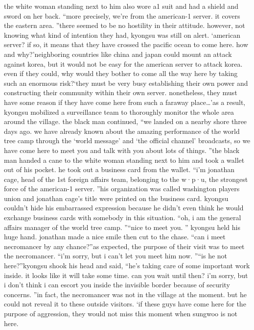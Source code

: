 the white woman standing next to him also wore a1 suit and had a shield and sword on her back.
“more precisely, we’re from the american-1 server.
 it covers the eastern area.
”there seemed to be no hostility in their attitude.
 however, not knowing what kind of intention they had, kyongsu was still on alert.
‘american server? if so, it means that they have crossed the pacific ocean to come here.
 how and why?’neighboring countries like china and japan could mount an attack against korea, but it would not be easy for the american server to attack korea.
even if they could, why would they bother to come all the way here by taking such an enormous risk?‘they must be very busy establishing their own power and constructing their community within their own server.
 nonetheless, they must have some reason if they have come here from such a faraway place…’as a result, kyongsu mobilized a surveillance team to thoroughly monitor the whole area around the village.
the black man continued, “we landed on a nearby shore three days ago.
 we have already known about the amazing performance of the world tree camp through the ‘world message’ and ‘the official channel’ broadcasts, so we have come here to meet you and talk with you about lots of things.
”the black man handed a cane to the white woman standing next to him and took a wallet out of his pocket.
 he took out a business card from the wallet.
“i’m jonathan cage, head of the 1st foreign affairs team, belonging to the w·p·u, the strongest force of the american-1 server.
”his organization was called washington players union and jonathan cage’s title were printed on the business card.
kyongsu couldn’t hide his embarrassed expression because he didn’t even think he would exchange business cards with somebody in this situation.
“oh, i am the general affairs manager of the world tree camp.
”“nice to meet you.
”
kyongsu held his huge hand.
 jonathan made a nice smile then cut to the chase.
“can i meet necromancer by any chance?”as expected, the purpose of their visit was to meet the necromancer.
“i’m sorry, but i can’t let you meet him now.
”“is he not here?”kyongsu shook his head and said, “he’s taking care of some important work inside.
 it looks like it will take some time.
 can you wait until then? i’m sorry, but i don’t think i can escort you inside the invisible border because of security concerns.
”in fact, the necromancer was not in the village at the moment.
 but he could not reveal it to these outside visitors.
‘if these guys have come here for the purpose of aggression, they would not miss this moment when sungwoo is not here.
